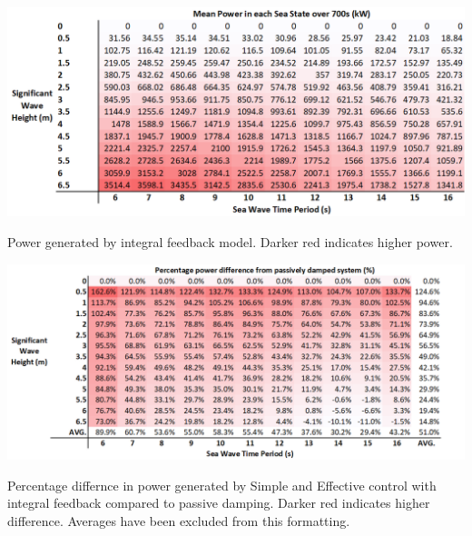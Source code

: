 \documentclass{report}
\begin{document}
\begin{table}
\hspace{-3cm}
\includegraphics[scale=0.7]{tables/integralControlResults}
\caption{Power generated by integral feedback model. Darker red indicates higher power.}
\label{integralResults}
\end{table}

\begin{table}
\hspace{-3cm}
\includegraphics[scale=0.7]{tables/integralControlPercent}
\caption{Percentage differnce in power generated by Simple and Effective control with integral feedback compared to passive damping. Darker red indicates higher difference. Averages have been excluded from this formatting.}
\label{integralPercents}
\end{table}
\end{document}
